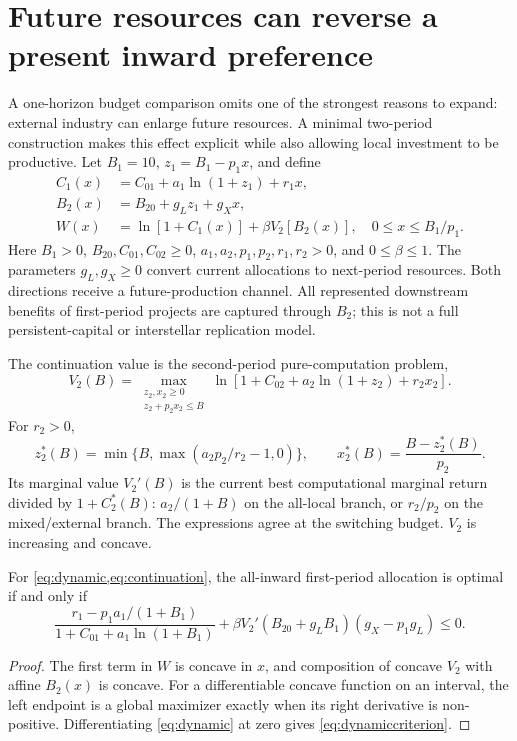 \section{Future resources can reverse a present inward preference}
\label{sec:dynamic}

A one-horizon budget comparison omits one of the strongest reasons to expand: external industry can enlarge future resources. A minimal two-period construction makes this effect explicit while also allowing local investment to be productive. Let $B_1=10$, $z_1=B_1-p_1x$, and define
\begin{align}
 C_1(x)&=C_{01}+a_1\ln(1+z_1)+r_1x,\nonumber\\
 B_2(x)&=B_{20}+g_Lz_1+g_Xx,\label{eq:futurebudget}\\
 W(x)&=\ln[1+C_1(x)]+\beta V_2[B_2(x)],\quad 0\leq x\leq B_1/p_1.
 \label{eq:dynamic}
\end{align}
Here $B_1>0$, $B_{20},C_{01},C_{02}\geq0$, $a_1,a_2,p_1,p_2,r_1,r_2>0$, and $0\leq\beta\leq1$. The parameters $g_L,g_X\geq0$ convert current allocations to next-period resources. Both directions receive a future-production channel. All represented downstream benefits of first-period projects are captured through $B_2$; this is not a full persistent-capital or interstellar replication model.

The continuation value is the second-period pure-computation problem,
\begin{equation}
 V_2(B)=\max_{\substack{z_2,x_2\geq0\\z_2+p_2x_2\leq B}}\ln[1+C_{02}+a_2\ln(1+z_2)+r_2x_2].
 \label{eq:continuation}
\end{equation}
For $r_2>0$,
\begin{equation}
 z_2^*(B)=\min\{B,\max(a_2p_2/r_2-1,0)\},\qquad
 x_2^*(B)=\frac{B-z_2^*(B)}{p_2}.
 \label{eq:stage2}
\end{equation}
Its marginal value $V_2'(B)$ is the current best computational marginal return divided by $1+C_2^*(B)$: $a_2/(1+B)$ on the all-local branch, or $r_2/p_2$ on the mixed/external branch. The expressions agree at the switching budget. $V_2$ is increasing and concave.

\begin{proposition}
\label{prop:dynamic}
For \cref{eq:dynamic,eq:continuation}, the all-inward first-period allocation is optimal if and only if
\begin{equation}
 \frac{r_1-p_1a_1/(1+B_1)}{1+C_{01}+a_1\ln(1+B_1)}
 +\beta V_2'(B_{20}+g_LB_1)(g_X-p_1g_L)\leq0.
 \label{eq:dynamiccriterion}
\end{equation}
\end{proposition}
\begin{proof}
The first term in $W$ is concave in $x$, and composition of concave $V_2$ with affine $B_2(x)$ is concave. For a differentiable concave function on an interval, the left endpoint is a global maximizer exactly when its right derivative is non-positive. Differentiating \cref{eq:dynamic} at zero gives \cref{eq:dynamiccriterion}.
\end{proof}

